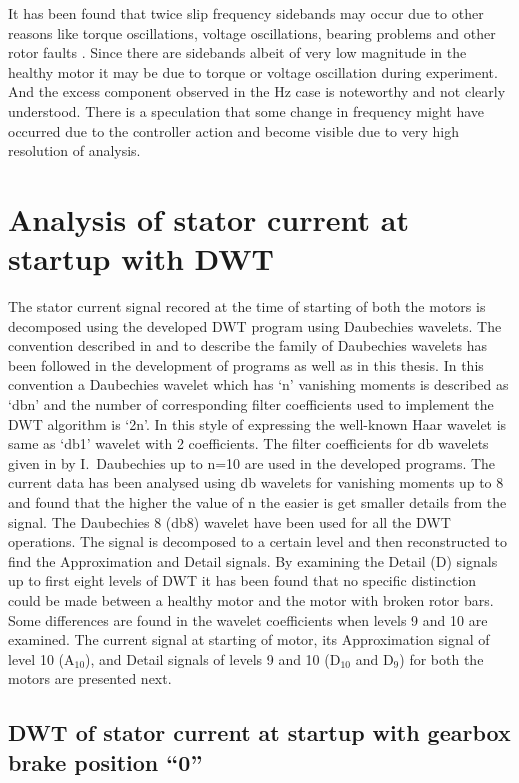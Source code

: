 \documentclass[a4paper,11pt]{report}
\begin{document}
It has been found that twice slip frequency sidebands may occur due to other reasons like torque oscillations, voltage oscillations, bearing problems and other rotor faults \cite{antonino}. Since there are sidebands albeit of very low magnitude in the healthy motor it may be due to torque or voltage oscillation during experiment. And the excess component observed in the \unit[50]{Hz} case is noteworthy and not clearly understood. There is a speculation that some change in frequency might have occurred due to the controller action and become visible due to very high resolution of analysis. 

\section{Analysis of stator current at startup with DWT}
The stator current signal recored at the time of starting of both the motors is decomposed using the developed DWT program using Daubechies wavelets. The convention described in \cite{stark} and \cite{wavletug} to describe the family of Daubechies wavelets has been followed in the development of programs as well as in this thesis. In this convention a Daubechies wavelet which has `n' vanishing moments is described as `dbn' and the number of corresponding filter coefficients used to implement the DWT algorithm is `2n'. In this style of expressing the well-known Haar wavelet is same as `db1' wavelet with 2 coefficients. The filter coefficients for db wavelets given in \cite{daub} by I.~Daubechies up to n=10 are used in the developed programs. The current data has been analysed using db wavelets for vanishing moments up to 8 and found that the higher the value of n the easier is get smaller details from the signal. The Daubechies 8 (db8) wavelet have been used for all the DWT operations. The signal is decomposed to a certain level and then reconstructed to find the Approximation and Detail signals. By examining the Detail (D) signals up to first eight levels of DWT it has been found that no specific distinction could be made between a healthy motor and the motor with broken rotor bars. Some differences are found in the wavelet coefficients when levels 9 and 10 are examined. The current signal at starting of motor, its Approximation signal of level 10 ($\textrm{A}_{10}$), and Detail signals of levels 9 and 10 ($\textrm{D}_{10}$ and $\textrm{D}_{9}$) for both the motors are presented next. 

\clearpage
\subsection{DWT of stator current at startup with gearbox brake position ``0''}
\end{document}
